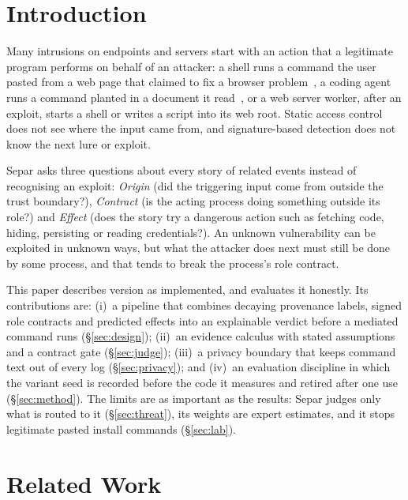 \documentclass[10pt,twocolumn,letterpaper]{article}
\begin{document}
\section{Introduction}
\label{sec:intro}

Many intrusions on endpoints and servers start with an action that a legitimate program performs
on behalf of an attacker: a shell runs a command the user pasted from a web page that claimed to
fix a browser problem~\cite{mitre2024attack}, a coding agent runs a command planted in a document
it read~\cite{greshake2023not}, or a web server worker, after an exploit, starts a shell or writes a
script into its web root. Static access control does not see where the input came from, and
signature-based detection does not know the next lure or exploit.

Separ asks three questions about every story of related events instead of recognising an exploit:
\emph{Origin} (did the triggering input come from outside the trust boundary?), \emph{Contract}
(is the acting process doing something outside its role?) and \emph{Effect} (does the story try a
dangerous action such as fetching code, hiding, persisting or reading credentials?). An unknown
vulnerability can be exploited in unknown ways, but what the attacker does next must still be done
by some process, and that tends to break the process's role contract.

This paper describes version \Version{} as implemented, and evaluates it honestly. Its
contributions are: (i)~a pipeline that combines decaying provenance labels, signed role contracts
and predicted effects into an explainable verdict before a mediated command runs
(\S\ref{sec:design}); (ii)~an evidence calculus with stated assumptions and a contract gate
(\S\ref{sec:judge}); (iii)~a privacy boundary that keeps command text out of every log
(\S\ref{sec:privacy}); and (iv)~an evaluation discipline in which the variant seed is recorded
before the code it measures and retired after one use (\S\ref{sec:method}). The limits are as
important as the results: Separ judges only what is routed to it (\S\ref{sec:threat}), its
weights are expert estimates, and it stops legitimate pasted install commands
(\S\ref{sec:lab}).

\section{Related Work}
\label{sec:related}
\end{document}

